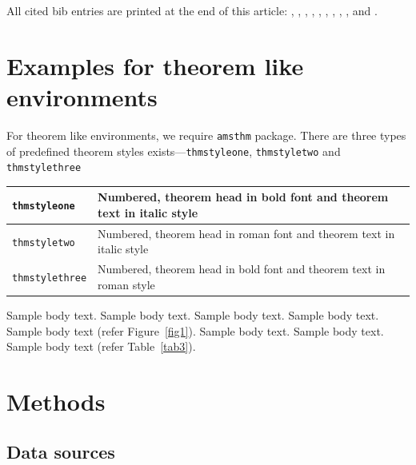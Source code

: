 \documentclass[lineno,pdflatex,sn-nature]{sn-jnl}%
\begin{document}
All cited bib entries are printed at the end of this article: \cite{bib3}, \cite{bib4}, \cite{bib5}, \cite{bib6}, \cite{bib7}, \cite{bib8}, \cite{bib9}, \cite{bib10}, \cite{bib11}, \cite{bib12} and \cite{bib13}.

\section{Examples for theorem like environments}\label{sec10}

For theorem like environments, we require \verb+amsthm+ package. There are three types of predefined theorem styles exists---\verb+thmstyleone+, \verb+thmstyletwo+ and \verb+thmstylethree+ 

\bigskip
\begin{tabular}{|l|p{19pc}|}
\hline
\verb+thmstyleone+ & Numbered, theorem head in bold font and theorem text in italic style \\\hline
\verb+thmstyletwo+ & Numbered, theorem head in roman font and theorem text in italic style \\\hline
\verb+thmstylethree+ & Numbered, theorem head in bold font and theorem text in roman style \\\hline
\end{tabular}
\bigskip



Sample body text. Sample body text. Sample body text. Sample body text. Sample body text (refer Figure~\ref{fig1}). Sample body text. Sample body text. Sample body text (refer Table~\ref{tab3}). 

\section{Methods}\label{methods}

\subsection{Data sources}
\end{document}

